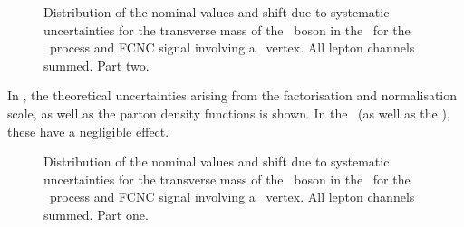 \begin{figure}[htbp]
{	}
	\caption{Distribution of the nominal values and shift due to systematic uncertainties for the transverse mass of the \PW\ boson in the \STSR\ for the \WZ\ process and FCNC signal involving a \Zut\ vertex. All lepton channels summed. Part two.}
	\label{fig:shiftBDTSTZut}
\end{figure}

In , the theoretical uncertainties arising from the factorisation and normalisation scale, as well as the parton density functions is shown. In the \STSR\ (as well as the \TTSR), these have a negligible effect. 
\begin{figure}[htbp] 
	\centering 
	
	\caption{Distribution of the nominal values and shift due to systematic uncertainties for the transverse mass of the \PW\ boson in the \STSR\ for the \WZ\ process and FCNC signal involving a \Zut\ vertex. All lepton channels summed. Part one.}
	\label{fig:shiftBDTSTZut1}
\end{figure}
\clearpage
